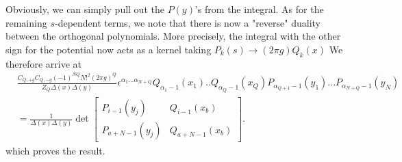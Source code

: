 \documentclass[english]{article}
\begin{document}
Obviously, we can simply pull out the $P(y)$'s from the integral. As for the remaining $s$-dependent terms, we note that there is now a "reverse" duality between the orthogonal polynomials. More precisely, the integral with the other sign for the potential now acts as a kernel taking $P_{k}(s) \rightarrow (2\pi g)Q_{k}(x)$
We therefore arrive at 
\begin{align}
    & \frac{C_{Q,+g}C_{Q,-g} (-1)^{NQ} N!^2 (2 \pi g)^Q}{Z_{Q} \Delta(x) \Delta(y)} \epsilon^{\alpha_{1}...\alpha_{N+Q}} Q_{\alpha_{1}-1}(x_{1})..Q_{\alpha_{Q}-1}(x_{Q})P_{\alpha_{Q+1}-1}(y_1)...P_{\alpha_{N+Q}-1}(y_N) \\
    & =  \boxed{\frac{1}{\Delta(x) \Delta(y)} \det \left[ \begin{array}{c|c} 
    P_{i-1}(y_{j}) & Q_{i-1}(x_{b}) \\ \hline
    P_{a+N-1}(y_{j}) & Q_{a+N-1}(x_{b}) 
    \end{array}\right]}.
\end{align}
which proves the result. 




















\end{document}
